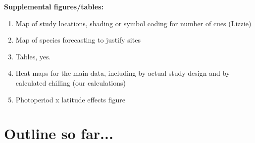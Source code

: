 \documentclass[11pt,letter]{article}
\begin{document}
{\bf Supplemental figures/tables:}
\begin{enumerate}
\item Map of study locations, shading or symbol coding for number of cues (Lizzie)
\item Map of species forecasting to justify sites
\item Tables, yes.
\item Heat maps for the main data, including by actual study design and by calculated chilling (our calculations)
\item Photoperiod x latitude effects figure
\end{enumerate}

\section{Outline so far...}
\end{document}
